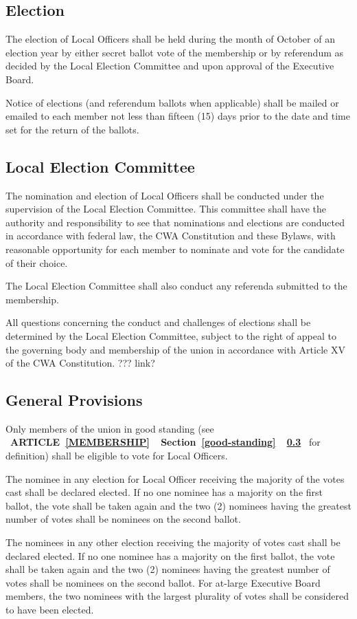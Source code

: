 \documentclass[12pt]{article}
\newcommand{\fullref}[3]{%
  \mbox{\textbf{%
    \ifthenelse{\isempty{#1}}%
    {}%
    {\MakeUppercase{Article \ref{#1}}}%
    \ifthenelse{\isempty{#2}}%
    {}%
    {%
      \ifthenelse{\isempty{#1}}{}{, }%
      Section \ref{#2}%
    }%
    \ifthenelse{\isempty{#3}}%
    {}%
    {\ref{#3}}%
  }}%
}
\begin{document}
\subsection{Election}
The election of Local Officers shall be held during the month of October of an election year by either secret ballot vote of the membership or by referendum as decided by the Local Election Committee and upon approval of the Executive Board.

Notice of elections (and referendum ballots when applicable) shall be mailed or emailed to each member not less than fifteen (15) days prior to the date and time set for the return of the ballots.

\subsection{Local Election Committee}
The nomination and election of Local Officers shall be conducted under the supervision of the Local Election Committee. This committee shall have the authority and responsibility to see that nominations and elections are conducted in accordance with federal law, the CWA Constitution and these Bylaws, with reasonable opportunity for each member to nominate and vote for the candidate of their choice.

The Local Election Committee shall also conduct any referenda submitted to the membership.

All questions concerning the conduct and challenges of elections shall be determined by the Local Election Committee, subject to the right of appeal to the governing body and membership of the union in accordance with Article XV of the CWA Constitution. ??? link?

\subsection{General Provisions}
Only members of the union in good standing (see \fullref{membership}{good-standing}{} for definition) shall be eligible to vote for Local Officers.

The nominee in any election for Local Officer receiving the majority of the votes cast shall be declared elected. If no one nominee has a majority on the first ballot, the vote shall be taken again and the two (2) nominees having the greatest number of votes shall be nominees on the second ballot.

The nominees in any other election receiving the majority of votes cast shall be declared elected. If no one nominee has a majority on the first ballot, the vote shall be taken again and the two (2) nominees having the greatest number of votes shall be nominees on the second ballot. For at-large Executive Board members, the two nominees with the largest plurality of votes shall be considered to have been elected.
\end{document}
